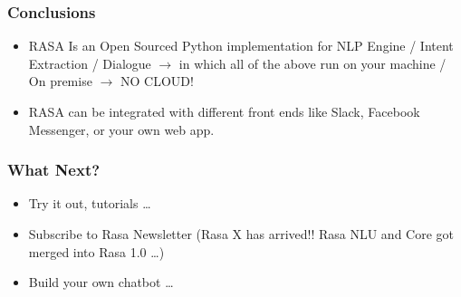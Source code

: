 \begin{frame}\frametitle{Conclusions}
\begin{itemize}
\item RASA Is an Open Sourced Python implementation for NLP Engine / Intent Extraction / Dialogue $\rightarrow$ in which all of the above run on your machine / On premise $\rightarrow$ NO CLOUD!
\item RASA can be integrated with different front ends like Slack, Facebook Messenger, or your own web app.
\end{itemize}
\end{frame}

\begin{frame}\frametitle{What Next?}
\begin{itemize}
\item Try it out, tutorials \ldots
\item Subscribe to Rasa Newsletter (Rasa X has arrived!! Rasa NLU and Core got merged into Rasa 1.0 \ldots)
\item Build your own chatbot \ldots %
\end{itemize}
\end{frame}
